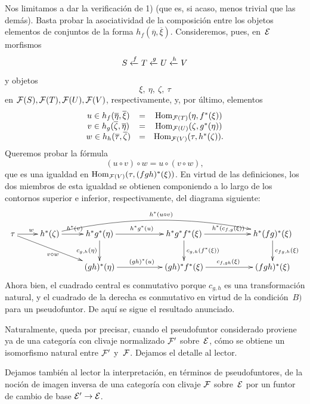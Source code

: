 Nos limitamos a dar la verificación de 1) (que es, si acaso, menos trivial
que las demás). Basta probar la asociatividad de la composición entre los
{objetos}
{elementos}
de conjuntos de la forma $h_f(\overline{\eta},\overline{\xi})$.
Consideremos, pues, en~$\cal{E}$ morfismos
$$
S\lfrom{f} T\lfrom{g} U\lfrom{h} V
$$
y objetos
$$
\xi,\ \eta,\ \zeta,\ \tau
$$
en $\cal{F}(S),\cal{F}(T),\cal{F}(U),\cal{F}(V)$, respectivamente, y,
por último, elementos
$$
\begin{array}{ccc}
u\in
h_f(\overline{\eta},\overline{\xi})&=&\Hom_{\cal{F}(T)}(\eta,f^*(\xi))\\
v\in
h_g(\overline{\zeta},\overline{\eta})&=&\Hom_{\cal{F}(U)}(\zeta,g^*(\eta))\\
w\in
h_h(\overline{\tau},\overline{\zeta})&=&\Hom_{\cal{F}(V)}(\tau,h^*(\zeta)).
\end{array}
$$
Queremos
probar la fórmula
$$
(u\circ v)\circ w = u\circ (v\circ w),
$$
que es una igualdad en
$\Hom_{\cal{F}(V)}(\tau,(fgh)^*(\xi))$. En virtud de las definiciones,
los dos miembros de esta igualdad se obtienen componiendo a lo largo de
los contornos superior e inferior, respectivamente, del diagrama
siguiente:
$$
\xymatrix{
\tau \ar[r]^w \ar[drr]_{v\circ w} & h^*(\zeta)
\ar[r]^{h^*(v)} \ar@/^1.4pc/[rrrrr]^{h^*(u\circ v)} & h^*g^*(\eta)
\ar[rr]^{h^*g^*(u)}
\ar[d]_{c_{g,h}(\eta)} & & h^*g^*f^*(\xi) \ar[rr]^{h^*(c_{f,g}(\xi))}
\ar[d]^{c_{g,h}(f^*(\xi))} & & h^*(fg)^*(\xi) \ar[d]^{c_{fg,h}(\xi)} \\
& & (gh)^*(\eta) \ar[rr]^{(gh)^*(u)} & & (gh)^*f^*(\xi)
\ar[rr]^{c_{f,gh}(\xi)} & & (fgh)^*(\xi) }
$$
Ahora bien, el cuadrado central es conmutativo porque $c_{g,h}$ es una
transformación natural, y el cuadrado de la derecha es conmutativo en
virtud de la condición~$B)$ para un pseudofuntor. De aquí se sigue el
resultado anunciado.

Naturalmente, queda por precisar, cuando el pseudofuntor considerado
proviene ya de una categoría con clivaje normalizado $\cal{F}'$
sobre~$\cal{E}$, cómo se obtiene un isomorfismo natural entre $\cal{F}'$
y~$\cal{F}$. Dejamos el detalle al lector.

Dejamos también al lector la interpretación, en términos de
pseudofuntores, de la noción de imagen inversa de una categoría con
clivaje $\cal{F}$ sobre~$\cal{E}$ por un funtor de cambio de base
$\cal{E}'\to\cal{E}$.
